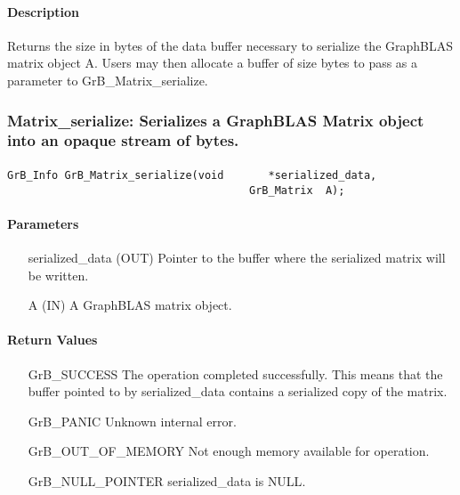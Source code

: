 \paragraph{Description}

Returns the size in bytes of the data buffer necessary to serialize the
GraphBLAS matrix object {\sf A}.  Users may then allocate a buffer of {\sf size}
bytes to pass as a parameter to {\sf GrB\_Matrix\_serialize}.


\subsubsection{{\sf Matrix\_serialize}: Serializes a GraphBLAS Matrix object into an opaque stream of bytes.}
\label{Sec:Matrix_serialize}

\paragraph{\syntax}

\begin{Verbatim}[samepage=true]
        GrB_Info GrB_Matrix_serialize(void       *serialized_data,
                                      GrB_Matrix  A);
\end{Verbatim}

\paragraph{Parameters}

\begin{itemize}[leftmargin=1.1in]
    \item[{\sf serialized\_data}] ({\sf OUT}) Pointer to the buffer where the serialized matrix will be written.
    \item[{\sf A}]      ({\sf IN}) A GraphBLAS matrix object.
\end{itemize}

\paragraph{Return Values}

\begin{itemize}[leftmargin=2.3in]
    \item[{\sf GrB\_SUCCESS}]         The operation completed successfully. This
      means that the buffer pointed to by {\sf serialized\_data} contains a
      serialized copy of the matrix.

    \item[{\sf GrB\_PANIC}]           Unknown internal error.
    
    \item[{\sf GrB\_OUT\_OF\_MEMORY}] Not enough memory available for operation.
    
    \item[{\sf GrB\_NULL\_POINTER}]  {\sf serialized\_data} is {\sf NULL}.
\end{itemize}

